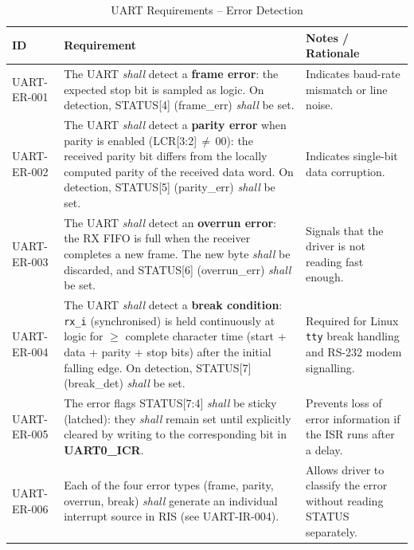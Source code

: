 \begin{table}[H]
\caption{UART Requirements -- Error Detection}
\label{tab:asUartReqER}
\centering
\begin{tabularx}{\textwidth}{|l |X |X|}
  \hline
  ID & Requirement & Notes / Rationale \\
  \hline
  \hline
  UART-ER-001 &
    The UART \textit{shall} detect a \textbf{frame error}:
    the expected stop bit is sampled as logic\;0.
    On detection, STATUS[4] (frame\_err) \textit{shall} be set. &
    Indicates baud-rate mismatch or line noise. \\
  \hline
  UART-ER-002 &
    The UART \textit{shall} detect a \textbf{parity error} when parity is
    enabled (LCR[3:2]\,$\neq$\,00): the received parity bit differs from
    the locally computed parity of the received data word.
    On detection, STATUS[5] (parity\_err) \textit{shall} be set. &
    Indicates single-bit data corruption. \\
  \hline
  UART-ER-003 &
    The UART \textit{shall} detect an \textbf{overrun error}:
    the RX FIFO is full when the receiver completes a new frame.
    The new byte \textit{shall} be discarded, and STATUS[6]
    (overrun\_err) \textit{shall} be set. &
    Signals that the driver is not reading fast enough. \\
  \hline
  UART-ER-004 &
    The UART \textit{shall} detect a \textbf{break condition}:
    \texttt{rx\_i} (synchronised) is held continuously at logic\;0 for
    $\geq$\;1 complete character time (start + data + parity + stop bits)
    after the initial falling edge.
    On detection, STATUS[7] (break\_det) \textit{shall} be set. &
    Required for Linux \texttt{tty} break handling and RS-232 modem
    signalling. \\
  \hline
  UART-ER-005 &
    The error flags STATUS[7:4] \textit{shall} be sticky (latched):
    they \textit{shall} remain set until explicitly cleared by writing\;1
    to the corresponding bit in \textbf{UART0\_ICR}. &
    Prevents loss of error information if the ISR runs after a delay. \\
  \hline
  UART-ER-006 &
    Each of the four error types (frame, parity, overrun, break)
    \textit{shall} generate an individual interrupt source in RIS
    (see UART-IR-004). &
    Allows driver to classify the error without reading STATUS separately. \\
  \hline
\end{tabularx}
\end{table}

